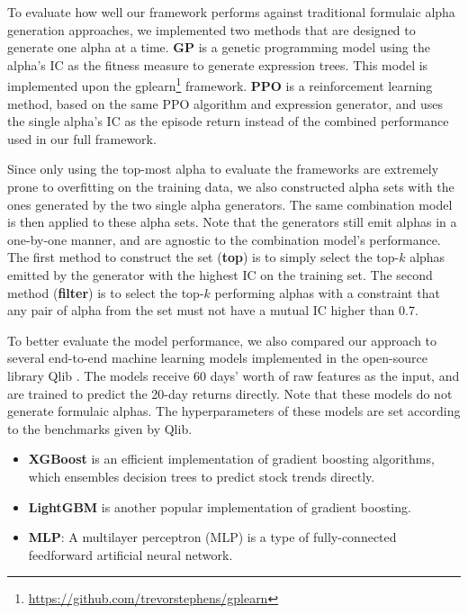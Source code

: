 To evaluate how well our framework performs against traditional formulaic alpha generation approaches, we implemented two methods that are designed to generate one alpha at a time. \textbf{GP} is a genetic programming model using the alpha's IC as the fitness measure to generate expression trees. This model is implemented upon the gplearn\footnote{\url{https://github.com/trevorstephens/gplearn}} framework. \textbf{PPO} is a reinforcement learning method, based on the same PPO \cite{ppo} algorithm and expression generator, and uses the single alpha's IC as the episode return instead of the combined performance used in our full framework.

Since only using the top-most alpha to evaluate the frameworks are extremely prone to overfitting on the training data, we also constructed alpha sets with the ones generated by the two single alpha generators. The same combination model is then applied to these alpha sets. Note that the generators still emit alphas in a one-by-one manner, and are agnostic to the combination model's performance. The first method to construct the set (\textbf{top}) is to simply select the top-$k$ alphas emitted by the generator with the highest IC on the training set. The second method (\textbf{filter}) is to select the top-$k$ performing alphas with a constraint that any pair of alpha from the set must not have a mutual IC higher than 0.7.

To better evaluate the model performance, we also compared our approach to several end-to-end machine learning models implemented in the open-source library Qlib \cite{qlib}. The models receive 60 days' worth of raw features as the input, and are trained to predict the 20-day returns directly. Note that these models do not generate formulaic alphas. The hyperparameters of these models are set according to the benchmarks given by Qlib.

\begin{itemize}
    \item \textbf{XGBoost} \cite{xgb} is an efficient implementation of gradient boosting algorithms, which ensembles decision trees to predict stock trends directly.
    \item \textbf{LightGBM} \cite{lgbm} is another popular implementation of gradient boosting.
    \item \textbf{MLP}: A multilayer perceptron (MLP) is a type of fully-con\-nec\-ted feedforward artificial neural network.
\end{itemize}

